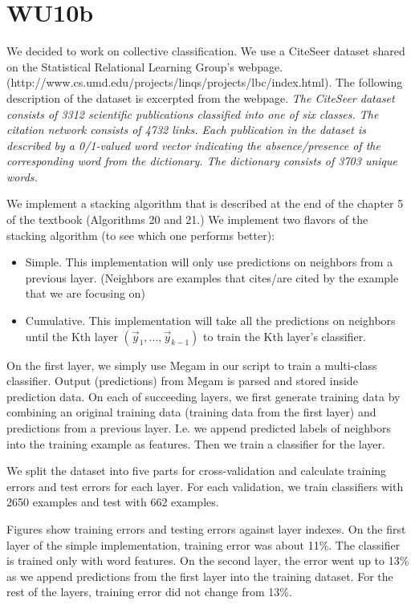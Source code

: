 \newpage
\section{WU10b}
We decided to work on collective classification. We use a CiteSeer dataset shared on the Statistical Relational Learning Group's webpage. (http://www.cs.umd.edu/projects/linqs/projects/lbc/index.html). The following description of the dataset is excerpted from the webpage. \textit{The CiteSeer dataset consists of 3312 scientific publications classified into one of six classes. The citation network consists of 4732 links. Each publication in the dataset is described by a 0/1-valued word vector indicating the absence/presence of the corresponding word from the dictionary. The dictionary consists of 3703 unique words.}

We implement a stacking algorithm that is described at the end of the chapter 5 of the textbook (Algorithms 20 and 21.) We implement two flavors of the stacking algorithm (to see which one performs better):
\begin{itemize}
	\item Simple. This implementation will only use predictions on neighbors from a previous layer. (Neighbors are examples that cites/are cited by the example that we are focusing on)
	\item Cumulative. This implementation will take all the predictions on neighbors until the Kth layer $(\vec y_1, ..., \vec y_{k-1})$ to train the Kth layer's classifier.
\end{itemize}
On the first layer, we simply use Megam in our script to train a multi-class classifier. Output (predictions) from Megam is parsed and stored inside prediction data. On each of succeeding layers, we first generate training data by combining an original training data (training data from the first layer) and predictions from a previous layer. I.e. we append predicted labels of neighbors into the training example as features. Then we train a classifier for the layer.

We split the dataset into five parts for cross-validation and calculate training errors and test errors for each layer. For each validation, we train classifiers with 2650 examples and test with 662 examples. 

Figures show training errors and testing errors against layer indexes. On the first layer of the simple implementation, training error was about 11\%. The classifier is trained only with word features. On the second layer, the error went up to 13\% as we append predictions from the first layer into the training dataset. For the rest of the layers, training error did not change from 13\%. 

